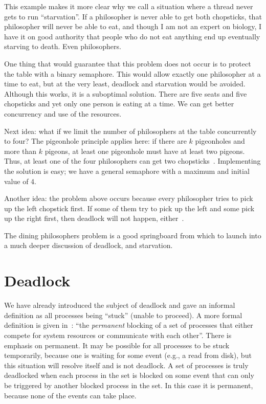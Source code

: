 This example makes it more clear why we call a situation where a thread never gets to run ``starvation''. If a philosopher is never able to get both chopsticks, that philosopher will never be able to eat, and though I am not an expert on biology, I have it on good authority that people who do not eat anything end up eventually starving to death. Even philosophers.

One thing that would guarantee that this problem does not occur is to protect the table with a binary semaphore. This would allow exactly one philosopher at a time to eat, but at the very least, deadlock and starvation would be avoided. Although this works, it is a suboptimal solution. There are five seats and five chopsticks and yet only one person is eating at a time. We can get better concurrency and use of the resources.

Next idea: what if we limit the number of philosophers at the table concurrently to four? The pigeonhole principle applies here: if there are $k$ pigeonholes and more than $k$ pigeons, at least one pigeonhole must have at least two pigeons. Thus, at least one of the four philosophers can get two chopsticks~\cite{mte241}. Implementing the solution is easy; we have a general semaphore with a maximum and initial value of 4.

Another idea: the problem above occurs because every philosopher tries to pick up the left chopstick first. If some of them try to pick up the left and some pick up the right first, then deadlock will not happen, either~\cite{osc}.

The dining philosophers problem is a good springboard from which to launch into a much deeper discussion of deadlock, and starvation.


\section*{Deadlock}
We have already introduced the subject of deadlock and gave an informal definition as all processes being ``stuck'' (unable to proceed). A more formal definition is given in~\cite{osi}: ``the \textit{permanent} blocking of a set of processes that either compete for system resources or communicate with each other''. There is emphasis on permanent. It may be possible for all processes to be stuck temporarily, because one is waiting for some event (e.g., a read from disk), but this situation will resolve itself and is not deadlock. A set of processes is truly deadlocked when each process in the set is blocked on some event that can only be triggered by another blocked process in the set. In this case it is permanent, because none of the events can take place.


